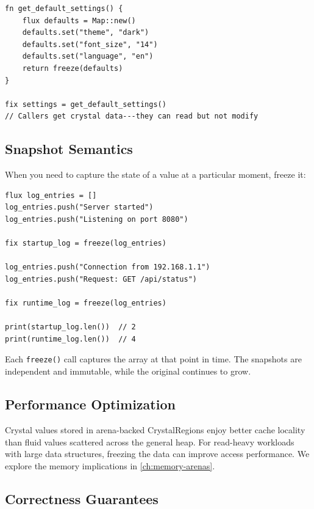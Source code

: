 \begin{lstlisting}[language=Lattice, caption={Returning frozen data from a function}]
fn get_default_settings() {
    flux defaults = Map::new()
    defaults.set("theme", "dark")
    defaults.set("font_size", "14")
    defaults.set("language", "en")
    return freeze(defaults)
}

fix settings = get_default_settings()
// Callers get crystal data---they can read but not modify
\end{lstlisting}

\subsection{Snapshot Semantics}

When you need to capture the state of a value at a particular moment, freeze it:

\begin{lstlisting}[language=Lattice, caption={Creating snapshots with freeze}]
flux log_entries = []
log_entries.push("Server started")
log_entries.push("Listening on port 8080")

fix startup_log = freeze(log_entries)

log_entries.push("Connection from 192.168.1.1")
log_entries.push("Request: GET /api/status")

fix runtime_log = freeze(log_entries)

print(startup_log.len())  // 2
print(runtime_log.len())  // 4
\end{lstlisting}

Each \lstinline|freeze()| call captures the array at that point in time.
The snapshots are independent and immutable, while the original continues to grow.

\subsection{Performance Optimization}

Crystal values stored in arena-backed CrystalRegions enjoy better cache locality than fluid values scattered across the general heap.
For read-heavy workloads with large data structures, freezing the data can improve access performance.
We explore the memory implications in \cref{ch:memory-arenas}.

\subsection{Correctness Guarantees}


